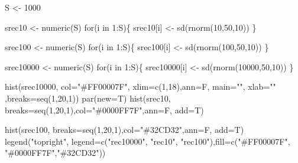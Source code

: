 \documentclass[
  letterpaper,
  DIV=11,
  numbers=noendperiod]{scrreprt}
\newenvironment{Shaded}{\begin{snugshade}}{\end{snugshade}}
\newcommand{\AttributeTok}[1]{\textcolor[rgb]{0.40,0.45,0.13}{#1}}
\newcommand{\ControlFlowTok}[1]{\textcolor[rgb]{0.00,0.23,0.31}{#1}}
\newcommand{\DecValTok}[1]{\textcolor[rgb]{0.68,0.00,0.00}{#1}}
\newcommand{\FunctionTok}[1]{\textcolor[rgb]{0.28,0.35,0.67}{#1}}
\newcommand{\NormalTok}[1]{\textcolor[rgb]{0.00,0.23,0.31}{#1}}
\newcommand{\OtherTok}[1]{\textcolor[rgb]{0.00,0.23,0.31}{#1}}
\newcommand{\SpecialCharTok}[1]{\textcolor[rgb]{0.37,0.37,0.37}{#1}}
\newcommand{\StringTok}[1]{\textcolor[rgb]{0.13,0.47,0.30}{#1}}
\begin{document}
\begin{Shaded}
\begin{Highlighting}[]
\NormalTok{S }\OtherTok{\textless{}{-}} \DecValTok{1000}

\NormalTok{srec10 }\OtherTok{\textless{}{-}} \FunctionTok{numeric}\NormalTok{(S)}
\ControlFlowTok{for}\NormalTok{(i }\ControlFlowTok{in} \DecValTok{1}\SpecialCharTok{:}\NormalTok{S)\{}
\NormalTok{  srec10[i] }\OtherTok{\textless{}{-}} \FunctionTok{sd}\NormalTok{(}\FunctionTok{rnorm}\NormalTok{(}\DecValTok{10}\NormalTok{,}\DecValTok{50}\NormalTok{,}\DecValTok{10}\NormalTok{))}
\NormalTok{\}}

\NormalTok{srec100 }\OtherTok{\textless{}{-}} \FunctionTok{numeric}\NormalTok{(S)}
\ControlFlowTok{for}\NormalTok{(i }\ControlFlowTok{in} \DecValTok{1}\SpecialCharTok{:}\NormalTok{S)\{}
\NormalTok{  srec100[i] }\OtherTok{\textless{}{-}} \FunctionTok{sd}\NormalTok{(}\FunctionTok{rnorm}\NormalTok{(}\DecValTok{100}\NormalTok{,}\DecValTok{50}\NormalTok{,}\DecValTok{10}\NormalTok{))}
\NormalTok{\}}


\NormalTok{srec10000 }\OtherTok{\textless{}{-}} \FunctionTok{numeric}\NormalTok{(S)}
\ControlFlowTok{for}\NormalTok{(i }\ControlFlowTok{in} \DecValTok{1}\SpecialCharTok{:}\NormalTok{S)\{}
\NormalTok{  srec10000[i] }\OtherTok{\textless{}{-}} \FunctionTok{sd}\NormalTok{(}\FunctionTok{rnorm}\NormalTok{(}\DecValTok{10000}\NormalTok{,}\DecValTok{50}\NormalTok{,}\DecValTok{10}\NormalTok{))}
\NormalTok{\}}



\FunctionTok{hist}\NormalTok{(srec10000, }\AttributeTok{col=}\StringTok{"\#FF00007F"}\NormalTok{, }\AttributeTok{xlim=}\FunctionTok{c}\NormalTok{(}\DecValTok{1}\NormalTok{,}\DecValTok{18}\NormalTok{),}\AttributeTok{ann=}\NormalTok{F, }\AttributeTok{main=}\StringTok{""}\NormalTok{, }\AttributeTok{xlab=}\StringTok{""}\NormalTok{ ,}\AttributeTok{breaks=}\FunctionTok{seq}\NormalTok{(}\DecValTok{1}\NormalTok{,}\DecValTok{20}\NormalTok{,}\DecValTok{1}\NormalTok{))}
\FunctionTok{par}\NormalTok{(}\AttributeTok{new=}\NormalTok{T)}
\FunctionTok{hist}\NormalTok{(srec10, }\AttributeTok{breaks=}\FunctionTok{seq}\NormalTok{(}\DecValTok{1}\NormalTok{,}\DecValTok{20}\NormalTok{,}\DecValTok{1}\NormalTok{),}\AttributeTok{col=}\StringTok{"\#0000FF7F"}\NormalTok{,}\AttributeTok{ann=}\NormalTok{F, }\AttributeTok{add=}\NormalTok{T)}

\FunctionTok{hist}\NormalTok{(srec100, }\AttributeTok{breaks=}\FunctionTok{seq}\NormalTok{(}\DecValTok{1}\NormalTok{,}\DecValTok{20}\NormalTok{,}\DecValTok{1}\NormalTok{),}\AttributeTok{col=}\StringTok{"\#32CD32"}\NormalTok{,}\AttributeTok{ann=}\NormalTok{F, }\AttributeTok{add=}\NormalTok{T)}
\FunctionTok{legend}\NormalTok{(}\StringTok{"topright"}\NormalTok{, }\AttributeTok{legend=}\FunctionTok{c}\NormalTok{(}\StringTok{"rec10000"}\NormalTok{, }\StringTok{"rec10"}\NormalTok{, }\StringTok{"rec100"}\NormalTok{),}\AttributeTok{fill=}\FunctionTok{c}\NormalTok{(}\StringTok{"\#FF00007F"}\NormalTok{, }\StringTok{"\#0000FF7F"}\NormalTok{,}\StringTok{"\#32CD32"}\NormalTok{))}
\end{Highlighting}
\end{Shaded}
\end{document}
